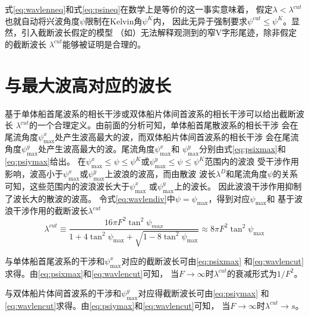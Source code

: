 式\eqref{eq:wavlenneq}和式\eqref{eq:psineq}在数学上是等价的这一事实意味着，
假定$\lambda<\lambda^{cut}$也就自动将兴波角度$\psi$限制在Kelvin角$\psi^K$内，
因此无异于强制要求$\psi^{cut}\le\psi^K$。显然，引入截断波长假定的模型
（如\parencite{Rabaud2013Ship}）无法解释观测到的窄V字形尾迹，除非假定的截断波长
$\lambda^{cut}$能够被证明是合理的。


\section{与最大波高对应的波长}
\label{sec:wavlen}

基于单体船首尾波系的相长干涉或双体船片体间首波系的相长干涉可以给出截断波长
$\lambda^{cut}$的一个合理定义。由前面的分析可知，单体船首尾散波系的相长干涉
会在尾流角度$\psi^x_{\max}$处产生波高最大的波，而双体船片体间首波系的相长干涉
会在尾流角度$\psi^y_{\max}$处产生波高最大的波。尾流角度$\psi^x_{\max}$和
$\psi^y_{\max}$分别由式\eqref{eq:psixmax}和\eqref{eq:psiymax}给出。
在$\psi^x_{\max}\le\psi\le\psi^K$或$\psi^y_{\max}\le\psi\le\psi^K$范围内的波浪
受干涉作用影响，波高小于$\psi^x_{\max}$或$\psi^y_{\max}$上波浪的波高，而由散波
波长$\lambda^D$和尾流角度$\psi$的关系可知，这些范围内的波浪波长大于$\psi^x_{\max}$
或$\psi^y_{\max}$上的波长。 因此波浪干涉作用抑制了波长大的散波的波高。
令式\eqref{eq:wavlendiv}中$\psi=\psi_{\max}$，得到对应$\psi_{\max}$和
基于波浪干涉作用的截断波长$\lambda^{cut}$
\begin{equation}
  \lambda^{cut}\equiv\frac{16\pi F^2\tan^2\psi_{max}}{1+4\tan^2\psi_{\max}+\sqrt{1-8\tan^2\psi_{\max}}}\approx 8\pi F^2\tan^2\psi_{\max}
  \label{eq:wavlencut}
\end{equation}

与单体船首尾波系的干涉和$\psi^x_{\max}$对应的截断波长可由\eqref{eq:psixmax}
和\eqref{eq:wavlencut}求得。由\eqref{eq:psixmax}和\eqref{eq:wavlencut}可知，
当$F\to\infty$时$\lambda^{cut}$的衰减形式为$1/F^2$。

与双体船片体间首波系的干涉和$\psi^y_{\max}$对应得截断波长可由\eqref{eq:psiymax}
和\eqref{eq:wavlencut}求得。由\eqref{eq:psiymax}和\eqref{eq:wavlencut}可知，
当$F\to\infty$时$\lambda^{cut}\to s$。

